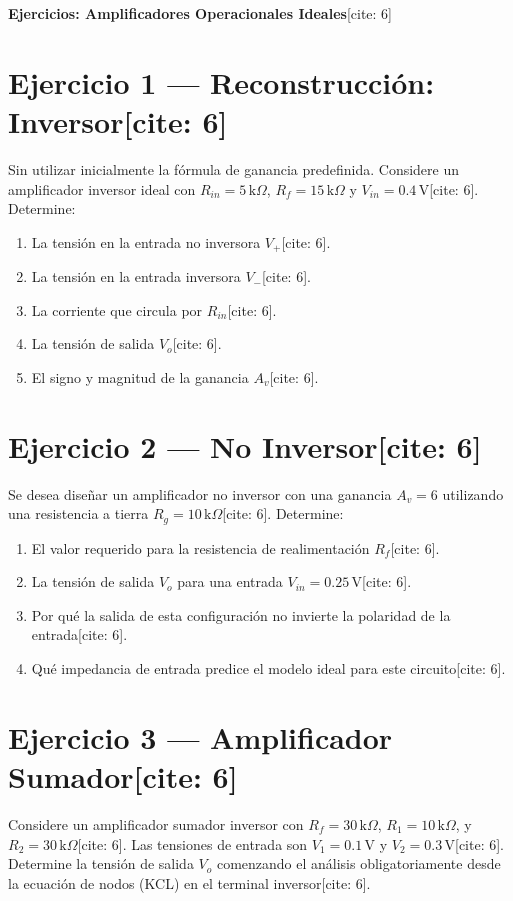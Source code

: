 \documentclass[11pt, a4paper]{article}
\begin{document}
\begin{center}
    \Large\textbf{\textcolor{ucbblue}{Ejercicios: Amplificadores Operacionales Ideales}}[cite: 6]
\end{center}

\section*{Ejercicio 1 — Reconstrucción: Inversor[cite: 6]}
Sin utilizar inicialmente la fórmula de ganancia predefinida. Considere un amplificador inversor ideal con $R_{in} = 5\,\text{k}\Omega$, $R_f = 15\,\text{k}\Omega$ y $V_{in} = 0.4\,\text{V}$[cite: 6]. Determine:
\begin{enumerate}
    \item La tensión en la entrada no inversora $V_+$[cite: 6].
    \item La tensión en la entrada inversora $V_-$[cite: 6].
    \item La corriente que circula por $R_{in}$[cite: 6].
    \item La tensión de salida $V_o$[cite: 6].
    \item El signo y magnitud de la ganancia $A_v$[cite: 6].
\end{enumerate}

\section*{Ejercicio 2 — No Inversor[cite: 6]}
Se desea diseñar un amplificador no inversor con una ganancia $A_v = 6$ utilizando una resistencia a tierra $R_g = 10\,\text{k}\Omega$[cite: 6]. Determine:
\begin{enumerate}
    \item El valor requerido para la resistencia de realimentación $R_f$[cite: 6].
    \item La tensión de salida $V_o$ para una entrada $V_{in} = 0.25\,\text{V}$[cite: 6].
    \item Por qué la salida de esta configuración no invierte la polaridad de la entrada[cite: 6].
    \item Qué impedancia de entrada predice el modelo ideal para este circuito[cite: 6].
\end{enumerate}

\section*{Ejercicio 3 — Amplificador Sumador[cite: 6]}
Considere un amplificador sumador inversor con $R_f = 30\,\text{k}\Omega$, $R_1 = 10\,\text{k}\Omega$, y $R_2 = 30\,\text{k}\Omega$[cite: 6]. Las tensiones de entrada son $V_1 = 0.1\,\text{V}$ y $V_2 = 0.3\,\text{V}$[cite: 6]. \\
Determine la tensión de salida $V_o$ comenzando el análisis obligatoriamente desde la ecuación de nodos (KCL) en el terminal inversor[cite: 6].
\end{document}
